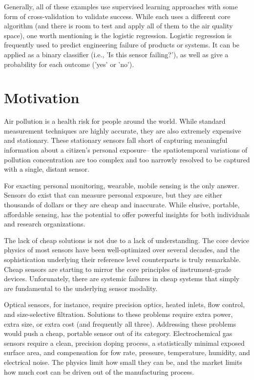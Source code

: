 Generally, all of these examples use supervised learning approaches with some form of cross-validation to validate success.  While each uses a different core algorithm (and there is room to test and apply all of them to the air quality space), one worth mentioning is the logistic regression.  Logistic regression is frequently used to predict engineering failure of products or systems.  It can be applied as a binary classifier (i.e., 'Is this sensor failing?'), as well as give a probability for each outcome ('yes' or 'no').
  

\section{Motivation}

Air pollution is a health risk for people around the world.  While standard measurement techniques are highly accurate, they are also extremely expensive and stationary.  These stationary sensors fall short of capturing meaningful information about a citizen's personal exposure-- the spatiotemporal variations of pollution concentration are too complex and too narrowly resolved to be captured with a single, distant sensor.

For exacting personal monitoring, wearable, mobile sensing is the only answer.  Sensors do exist that can measure personal exposure, but they are either thousands of dollars or they are cheap and inaccurate.  While elusive, portable, affordable sensing, has the potential to offer powerful insights for both individuals and research organizations.

The lack of cheap solutions is not due to a lack of understanding.  The core device physics of most sensors have been well-optimized over several decades, and the sophistication underlying their reference level counterparts is truly remarkable.  Cheap sensors are starting to mirror the core principles of instrument-grade devices.  Unforunately, there are systemic failures in cheap systems that simply are fundamental to the underlying sensor modality.  

Optical sensors, for instance, require precision optics, heated inlets, flow control, and size-selective filtration.  Solutions to these problems require extra power, extra size, or extra cost (and frequently all three).  Addressing these problems would push a cheap, portable sensor out of its category.  Electrochemical gas sensors require a clean, precision doping process, a statistically minimal exposed surface area, and compensation for fow rate, pressure, temperature, humidity, and electrical noise.  The physics limit how small they can be, and the market limits how much cost can be driven out of the manufacturing process.

